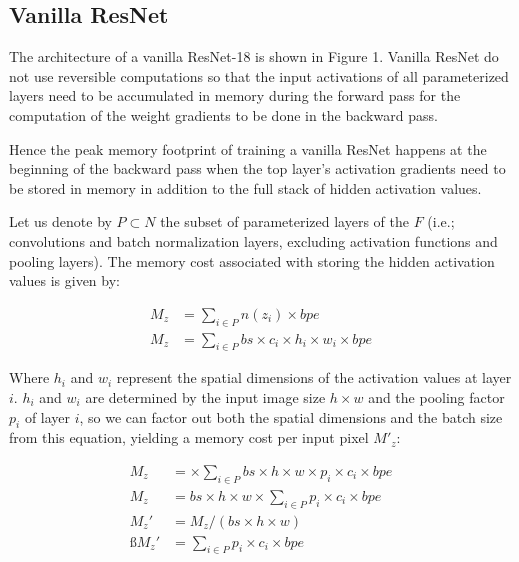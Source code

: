 \documentclass[twocolumn]{bmcart}
\begin{document}
\subsection{Vanilla ResNet}

The architecture of a vanilla ResNet-18 is shown in Figure 1.
Vanilla ResNet do not use reversible computations so that the input activations of all parameterized layers need to be accumulated in memory during the forward pass for the computation of the weight gradients to be done in the backward pass.

Hence the peak memory footprint of training a vanilla ResNet happens at the beginning of the backward pass when the top layer's activation gradients need to be stored in memory in addition to the full stack of hidden activation values.

Let us denote by $P \subset N$ the subset of parameterized layers of the $F$ 
(i.e.; convolutions and batch normalization layers, excluding activation functions and pooling layers). 
The memory cost associated with storing the hidden activation values is given by: 

\begin{subequations}
\begin{align}
M_{z} &= \sum_{i \in P} n(z_i) \times bpe \\
M_{z} &= \sum_{i \in P} bs \times c_i \times h_i \times w_i \times bpe 
\end{align}
\end{subequations}

Where $h_i$ and $w_i$ represent the spatial dimensions of the activation values at layer $i$.
$h_i$ and $w_i$ are determined by the input image size $h \times w$ and the pooling factor $p_i$ of layer $i$, so we can factor out both the spatial dimensions and the batch size from this equation, yielding a memory cost per input pixel $M'_z$:

\begin{subequations}
\begin{align}
M_{z} &= \times \sum_{i \in P} bs \times h \times w \times p_i \times c_i \times bpe \\
M_{z} &= bs \times h \times w \times \sum_{i \in P} p_i \times c_i \times bpe \\
M_{z}' &= M_{z} / (bs \times h \times w)  \\ß
M_{z}' &= \sum_{i \in P} p_i \times c_i \times bpe 
\end{align}
\end{subequations}
\end{document}
